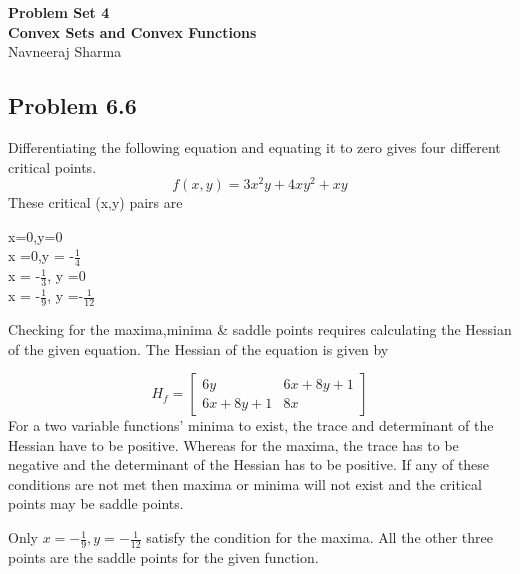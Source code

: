 \documentclass[letterpaper,12pt]{article}
\theoremstyle{definition}
\begin{document}
\begin{flushleft}
\textbf{\large{Problem Set 4}} \\
\vspace{2mm}
\textbf{\large{Convex Sets and Convex Functions}} \\
\vspace{2mm}
Navneeraj Sharma \\
\end{flushleft}

\vspace{2mm}


\subsection*{Problem 6.6}
Differentiating the following equation and equating it to zero gives four different critical points.
\begin{equation*}
  f(x,y) = 3x^2y + 4xy^2 + xy
\end{equation*}
These critical (x,y) pairs are
\begin{center}
x=0,y=0\\
\vspace{1mm}
x =0,y = -$\frac{1}{4}$\\
\vspace{1mm}
x = -$\frac{1}{3}$, y =0\\
\vspace{1mm}
x = -$\frac{1}{9}$, y =-$\frac{1}{12}$
\end{center}
\begin{flushleft}
Checking for the maxima,minima & saddle points requires calculating the Hessian of the given equation. The Hessian of the equation is given by 
\end{flushleft}
\begin{equation*}
H_{f} = \begin{bmatrix} 6y & 6x+8y+1\\6x+8y+1 & 8x \end{bmatrix}
\end{equation*}
For a two variable functions' minima to exist, the trace and determinant of the Hessian have to be positive. Whereas for the maxima, the trace has to be negative and the determinant of the Hessian has to be positive. If any of these conditions are not met then maxima or minima will not exist and the critical points may be saddle points.\\
\begin{flushleft}
Only $x = -\frac{1}{9}, y =-\frac{1}{12}$ satisfy the condition for the maxima. All the other three points are the saddle points for the given function.
\end{flushleft}
\end{document}
